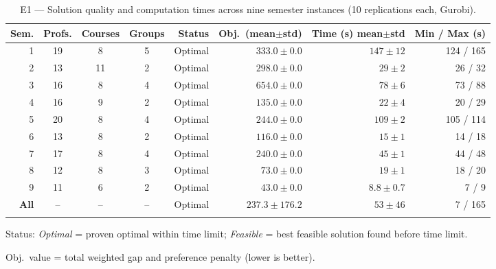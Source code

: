 \begin{table}[htbp]
\centering
\caption{E1 --- Solution quality and computation times across nine semester instances (10 replications each, Gurobi).}
\label{tab:e1_resultados}
\scriptsize
\begin{tabular}{rcccrrrr}
\toprule
\textbf{Sem.} & \textbf{Profs.} & \textbf{Courses} & \textbf{Groups}
  & \textbf{Status} & \textbf{Obj.\ (mean$\pm$std)} & \textbf{Time (s) mean$\pm$std} & \textbf{Min / Max (s)} \\
\midrule
  1 & 19 & 8 & 5 & Optimal & $333.0 \pm 0.0$ & $147 \pm 12$ & 124 / 165 \\
  2 & 13 & 11 & 2 & Optimal & $298.0 \pm 0.0$ & $29 \pm 2$ & 26 / 32 \\
  3 & 16 & 8 & 4 & Optimal & $654.0 \pm 0.0$ & $78 \pm 6$ & 73 / 88 \\
  4 & 16 & 9 & 2 & Optimal & $135.0 \pm 0.0$ & $22 \pm 4$ & 20 / 29 \\
  5 & 20 & 8 & 4 & Optimal & $244.0 \pm 0.0$ & $109 \pm 2$ & 105 / 114 \\
  6 & 13 & 8 & 2 & Optimal & $116.0 \pm 0.0$ & $15 \pm 1$ & 14 / 18 \\
  7 & 17 & 8 & 4 & Optimal & $240.0 \pm 0.0$ & $45 \pm 1$ & 44 / 48 \\
  8 & 12 & 8 & 3 & Optimal & $73.0 \pm 0.0$ & $19 \pm 1$ & 18 / 20 \\
  9 & 11 & 6 & 2 & Optimal & $43.0 \pm 0.0$ & $8.8 \pm 0.7$ & 7 / 9 \\
\midrule
  \textbf{All} & -- & -- & -- & Optimal & $237.3 \pm 176.2$ & $53 \pm 46$ & 7 / 165 \\
\botrule
\end{tabular}
\begin{tablenotes}
\small
\item Status: \textit{Optimal} = proven optimal within time limit; \textit{Feasible} = best feasible solution found before time limit.
\item Obj.\ value = total weighted gap and preference penalty (lower is better).
\end{tablenotes}
\end{table}
